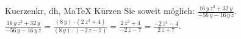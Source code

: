 \begin{MAufgabe}{Kuerzen}{kr, dh, MaTeX}
K\"urzen Sie soweit m\"oglich: $\frac{16\, y\, z^3 + 32\, y}{ - 56\, y - 16\, y\, z}$.\\ 
\ifLsg\MLoesung
\quad $\frac{16\, y\, z^3 + 32\, y}{ - 56\, y - 16\, y\, z}=\frac{(8\, y)\cdot(2\, z^3 + 4)}{(8\, y)\cdot( - 2\, z - 7)}=\frac{2\, z^3 + 4}{ - 2\, z - 7}=\frac{ - 2\, z^3 - 4}{2\, z + 7}$.\else\relax\fi
 \end{MAufgabe}